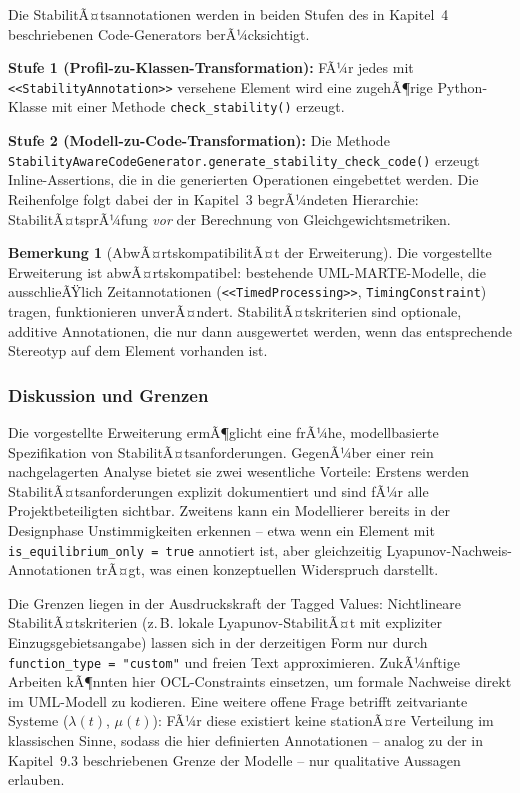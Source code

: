 ﻿\documentclass[a4paper,12pt]{scrreprt}
\theoremstyle{definition}
\newtheorem{bemerkung}{Bemerkung}[section]
\begin{document}
Die StabilitÃ¤tsannotationen werden in beiden Stufen des in Kapitel~4
beschriebenen Code-Generators berÃ¼cksichtigt.

\textbf{Stufe 1 (Profil-zu-Klassen-Transformation):} FÃ¼r jedes mit
\texttt{<<StabilityAnnota\newline tion>>} versehene Element wird eine zugehÃ¶rige
Python-Klasse mit einer Methode \texttt{check\_\newline stability()} erzeugt.

\textbf{Stufe 2 (Modell-zu-Code-Transformation):} Die Methode
\texttt{StabilityAwareCode\newline Generator\allowbreak.generate\_stability\_check\_code()}
erzeugt Inline-Assertions, die in die generierten Operationen eingebettet
werden. Die Reihenfolge folgt dabei der in Kapitel~3 begrÃ¼ndeten Hierarchie:
StabilitÃ¤tsprÃ¼fung \textit{vor} der Berechnung von Gleichgewichtsmetriken.

\begin{bemerkung}[AbwÃ¤rtskompatibilitÃ¤t der Erweiterung]
	Die vorgestellte Erweiterung ist abwÃ¤rtskompatibel: bestehende
	UML-MARTE-Modelle, die ausschlieÃŸlich Zeitannotationen
	(\texttt{<<TimedProcessing>>}, \texttt{TimingConstraint}) tragen,
	funktionieren unverÃ¤ndert. StabilitÃ¤tskriterien sind optionale, additive
	Annotationen, die nur dann ausgewertet werden, wenn das entsprechende
	Stereotyp auf dem Element vorhanden ist.
\end{bemerkung}

\subsubsection{Diskussion und Grenzen}

Die vorgestellte Erweiterung ermÃ¶glicht eine frÃ¼he, modellbasierte
Spezifikation von StabilitÃ¤tsanforderungen. GegenÃ¼ber einer rein
nachgelagerten Analyse bietet sie zwei wesentliche Vorteile: Erstens werden
StabilitÃ¤tsanforderungen explizit dokumentiert und sind fÃ¼r alle
Projektbeteiligten sichtbar. Zweitens kann ein Modellierer bereits in der
Designphase Unstimmigkeiten erkennen -- etwa wenn ein Element mit
\texttt{is\_equilibrium\_only = true} annotiert ist, aber gleichzeitig
Lyapunov-Nachweis-Annotationen trÃ¤gt, was einen konzeptuellen Widerspruch
darstellt.

Die Grenzen liegen in der Ausdruckskraft der Tagged Values: Nichtlineare
StabilitÃ¤tskriterien (z.\,B. lokale Lyapunov-StabilitÃ¤t mit expliziter
Einzugsgebietsangabe) lassen sich in der derzeitigen Form nur durch
\texttt{function\_type = "custom"} und freien Text approximieren. ZukÃ¼nftige
Arbeiten kÃ¶nnten hier OCL-Constraints einsetzen, um formale Nachweise direkt
im UML-Modell zu kodieren. Eine weitere offene Frage betrifft
zeitvariante Systeme ($\lambda(t)$, $\mu(t)$): FÃ¼r diese existiert keine
stationÃ¤re Verteilung im klassischen Sinne, sodass die hier definierten
Annotationen -- analog zu der in Kapitel~9.3 beschriebenen Grenze der
Modelle -- nur qualitative Aussagen erlauben.
\end{document}
